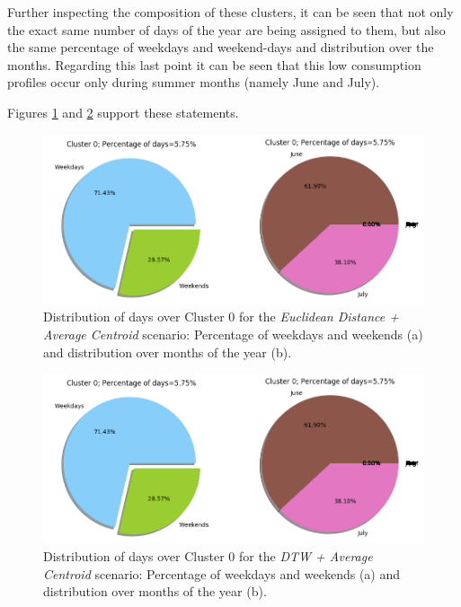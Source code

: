 \documentclass[9pt,journal,compsoc]{IEEEtran}
\begin{document}
Further inspecting the composition of these clusters, it can be seen that not only the exact same number of days of the year are being assigned to them, but also the same percentage of weekdays and weekend-days and distribution over the months. Regarding this last point it can be seen that this low consumption profiles occur only during summer months (namely June and July).

Figures \ref{distribution_euclidean_average_4clusters} and \ref{distribution_raw_average_4clusters} support these statements.

\begin{figure}
	\centering
	\includegraphics[scale=0.4]{images/percent_week_months_raw_average_4.png}
	\caption{Distribution of days over Cluster $0$ for the \emph{Euclidean Distance + Average Centroid} scenario: Percentage of weekdays and weekends (a) and distribution over months of the year (b).}
	\label{distribution_euclidean_average_4clusters}
\end{figure}

\begin{figure}
	\centering
	\includegraphics[scale=0.4]{images/percent_week_months_raw_average_4.png}
	\caption{Distribution of days over Cluster $0$ for the \emph{DTW + Average Centroid} scenario: Percentage of weekdays and weekends (a) and distribution over months of the year (b).}
	\label{distribution_raw_average_4clusters}
\end{figure}
\end{document}
